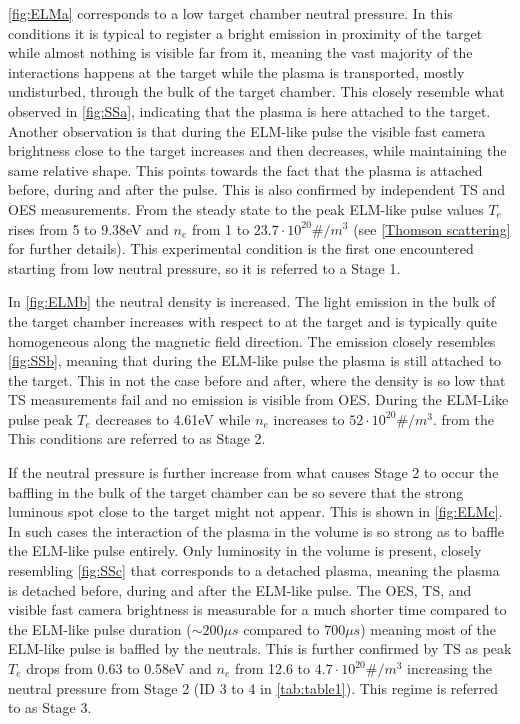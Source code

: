 \autoref{fig:ELMa} corresponds to a low target chamber neutral pressure. In this conditions it is typical to register a bright emission in proximity of the target while almost nothing is visible far from it, meaning the vast majority of the interactions happens at the target while the plasma is transported, mostly undisturbed, through the bulk of the target chamber. This closely resemble what observed in \autoref{fig:SSa}, indicating that the plasma is here attached to the target. Another observation is that during the ELM-like pulse the visible fast  camera brightness close to the target increases and then decreases, while maintaining the same relative shape. This points towards the fact that the plasma is attached before, during and after the pulse. This is also confirmed by independent TS and OES measurements. From the steady state to the peak ELM-like pulse values $T_e$ rises from 5 to 9.38eV and $n_e$ from 1 to $23.7 \cdot10^{20}\#/m^3$ (see \autoref{Thomson scattering} for further details). This experimental condition is the first one encountered starting from low neutral pressure, so it is referred to a Stage 1. 

In \autoref{fig:ELMb} the neutral density is increased. The light emission in the bulk of the target chamber increases with respect to at the target and is typically quite homogeneous along the magnetic field direction. The emission closely resembles \autoref{fig:SSb}, meaning that during the ELM-like pulse the plasma is still attached to the target. This in not the case before and after, where the density is so low that TS measurements fail and no emission is visible from OES. During the ELM-Like pulse peak $T_e$ decreases to 4.61eV while $n_e$ increases to $52 \cdot 10^{20}\#/m^3$. from the  This conditions are referred to as Stage 2.

If the neutral pressure is further increase from what causes Stage 2 to occur the baffling in the bulk of the target chamber can be so severe that the strong luminous spot close to the target might not appear. This is shown in \autoref{fig:ELMc}. In such cases the interaction of the plasma in the volume is so strong as to baffle the ELM-like pulse entirely. Only luminosity in the volume is present, closely resembling \autoref{fig:SSc} that corresponds to a detached plasma, meaning the plasma is detached before, during and after the ELM-like pulse. The OES, TS, and visible fast camera brightness is measurable for a much shorter time compared to the ELM-like pulse duration ($\sim 200 \mu s$ compared to $700 \mu s$) meaning most of the ELM-like pulse is baffled by the neutrals. This is further confirmed by TS as peak $T_e$ drops from 0.63 to 0.58eV and $n_e$ from 12.6 to $4.7 \cdot10^{20}\#/m^3$ increasing the neutral pressure from Stage 2 (ID 3 to 4 in \autoref{tab:table1}). This regime is referred to as Stage 3.

